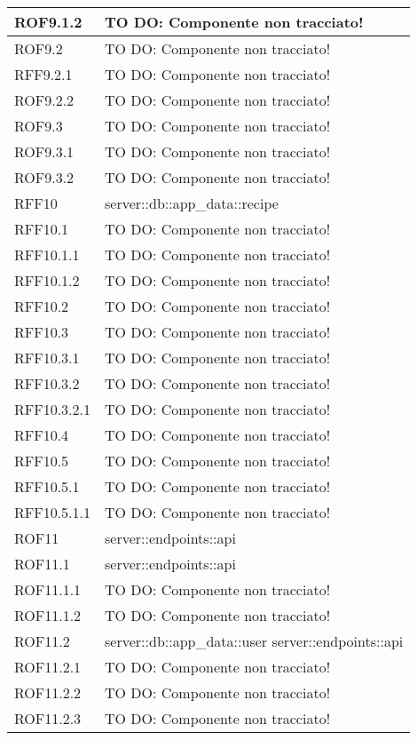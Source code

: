 \begin{center}
\begin{longtable}{| p{4cm} | p{8cm} |}
\hline
ROF9.1.2 & TO DO: Componente non tracciato! \\
\hline
ROF9.2 & TO DO: Componente non tracciato! \\
\hline
RFF9.2.1 & TO DO: Componente non tracciato! \\
\hline
ROF9.2.2 & TO DO: Componente non tracciato! \\
\hline
ROF9.3 & TO DO: Componente non tracciato! \\
\hline
ROF9.3.1 & TO DO: Componente non tracciato! \\
\hline
ROF9.3.2 & TO DO: Componente non tracciato! \\
\hline
RFF10 & server::db::app\_data::recipe \\
\hline
RFF10.1 & TO DO: Componente non tracciato! \\
\hline
RFF10.1.1 & TO DO: Componente non tracciato! \\
\hline
RFF10.1.2 & TO DO: Componente non tracciato! \\
\hline
RFF10.2 & TO DO: Componente non tracciato! \\
\hline
RFF10.3 & TO DO: Componente non tracciato! \\
\hline
RFF10.3.1 & TO DO: Componente non tracciato! \\
\hline
RFF10.3.2 & TO DO: Componente non tracciato! \\
\hline
RFF10.3.2.1 & TO DO: Componente non tracciato! \\
\hline
RFF10.4 & TO DO: Componente non tracciato! \\
\hline
RFF10.5 & TO DO: Componente non tracciato! \\
\hline
RFF10.5.1 & TO DO: Componente non tracciato! \\
\hline
RFF10.5.1.1 & TO DO: Componente non tracciato! \\
\hline
ROF11 & server::endpoints::api \\
\hline
ROF11.1 & server::endpoints::api \\
\hline
ROF11.1.1 & TO DO: Componente non tracciato! \\
\hline
ROF11.1.2 & TO DO: Componente non tracciato! \\
\hline
ROF11.2 & server::db::app\_data::user \newline server::endpoints::api \\
\hline
ROF11.2.1 & TO DO: Componente non tracciato! \\
\hline
ROF11.2.2 & TO DO: Componente non tracciato! \\
\hline
ROF11.2.3 & TO DO: Componente non tracciato! \\

\end{longtable}
\end{center}
